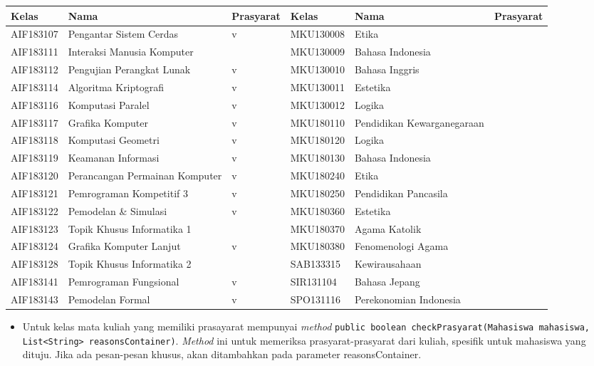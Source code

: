 \begin{enumerate}
\begin{table}[H]
\centering
\label{tab:kelasmatakuliah2018_rincian_4}
\begin{tabular}{|p{2cm}|p{3.5cm}|p{1.75cm}|p{2cm}|p{3.5cm}|p{1.75cm}|}
\hline
\textbf{Kelas} & \textbf{Nama} & \textbf{Prasyarat} & \textbf{Kelas} & \textbf{Nama} & \textbf{Prasyarat} \\ \hline
AIF183107 & Pengantar Sistem Cerdas & v & MKU130008 & Etika &  \\ \hline
AIF183111 & Interaksi Manusia Komputer & & MKU130009 & Bahasa Indonesia & \\ \hline
AIF183112 & Pengujian Perangkat Lunak & v & MKU130010 & Bahasa Inggris &  \\ \hline
AIF183114 & Algoritma Kriptografi & v & MKU130011 & Estetika &  \\ \hline
AIF183116 & Komputasi Paralel & v & MKU130012 & Logika &  \\ \hline
AIF183117 & Grafika Komputer & v & MKU180110 & Pendidikan Kewarganegaraan &  \\ \hline
AIF183118 & Komputasi Geometri & v & MKU180120 & Logika &  \\ \hline
AIF183119 & Keamanan Informasi & v & MKU180130 & Bahasa Indonesia &  \\ \hline
AIF183120 & Perancangan Permainan Komputer & v & MKU180240 & Etika &  \\ \hline
AIF183121 & Pemrograman Kompetitif 3 & v & MKU180250 & Pendidikan Pancasila &  \\ \hline
AIF183122 & Pemodelan \& Simulasi & v & MKU180360 & Estetika &  \\ \hline
AIF183123 & Topik Khusus Informatika 1 & & MKU180370 & Agama Katolik & \\ \hline
AIF183124 & Grafika Komputer Lanjut & v & MKU180380 & Fenomenologi Agama &  \\ \hline
AIF183128 & Topik Khusus Informatika 2 & & SAB133315 & Kewirausahaan & \\ \hline
AIF183141 & Pemrograman Fungsional & v & SIR131104 & Bahasa Jepang &  \\ \hline
AIF183143 & Pemodelan Formal & v & SPO131116 & Perekonomian Indonesia &  \\ \hline
\end{tabular}
\end{table}
	\begin{itemize}
		\item Untuk kelas mata kuliah yang memiliki prasayarat mempunyai \textit{method} \texttt{public boolean checkPrasyarat(Mahasiswa mahasiswa, List<String> reasonsContainer)}. \textit{Method} ini untuk memeriksa prasyarat-prasyarat dari kuliah, spesifik untuk mahasiswa yang dituju. Jika ada pesan-pesan khusus, akan ditambahkan pada parameter reasonsContainer.\\

\end{itemize}
\end{enumerate}
